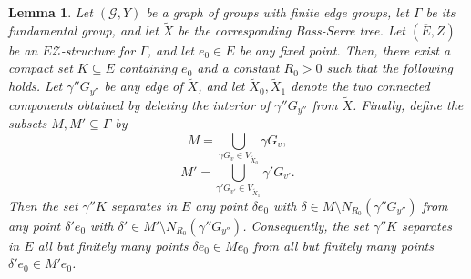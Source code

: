 \documentclass[12pt, a4paper]{article}
\newcommand{\8}{\infty}
\theoremstyle{break}
\newtheorem{lm}[thm]{Lemma}
\theoremstyle{defbreak}
\newcommand{\ol}[1]{\overline{#1}}
\newcommand{\wtl}[1]{\widetilde{#1}}
\begin{document}

\medskip

\begin{lm} \label{lemma:separating_set_in_EZ}
    Let $(\mathcal G,Y)$ be a graph of groups with finite edge groups,
    let $\Gamma$ be its fundamental group, and let $\wtl{X}$ be the corresponding
    Bass-Serre tree. Let $(\ol{E},Z)$ be an $E\mathcal{Z}$-structure for $\Gamma$, and
    let $e_0\in E$ be any fixed point. Then, there exist a compact set $K\subseteq E$ containing $e_0$ and a constant $R_0>0$ such that the following holds.
    Let $\gamma'' G_{y''}$ be any edge of $\wtl{X}$, and let
    $\wtl{X}_0, \wtl{X}_1$ denote the two connected components obtained by deleting 
    the interior of  ${\gamma''G_{y''}}$ from $\wtl{X}$.
    Finally, define the subsets $M,M'\subseteq\Gamma$ by
    $$M =\bigcup_{\gamma G_v \in V_{\wtl{X}_0}}\gamma G_v,$$
    $$M'=\bigcup_{\gamma' G_{v'} \in V_{\wtl{X}_1}}\gamma'G_{v'}.$$
    Then the set $\gamma'' K$ separates in $E$ any  point $\delta e_0$ with $\delta\in M\setminus N_{R_0}(\gamma''G_{y''})$ from any point $\delta'e_0$ with $\delta'\in M'\setminus N_{R_0}(\gamma''G_{y''})$.
    Consequently, the set $\gamma'' K$ separates in $E$ all but finitely many points $\delta e_0 \in Me_0$ from all but finitely many points $\delta'e_0\in M'e_0$.
\end{lm}
\end{document}
